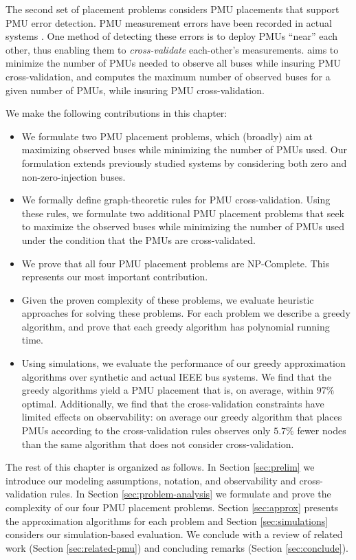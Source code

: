 The second set of placement problems considers PMU placements that support PMU error detection. PMU measurement errors have been recorded in actual systems \cite{Vanfretti10}. 
One method of detecting these errors is to deploy PMUs ``near'' each other, thus enabling them to {\em cross-validate} each-other's measurements. 
{\xvals} aims to minimize the number of PMUs needed to observe all buses while insuring PMU cross-validation, and {\xvalparts} computes the maximum number of observed buses for a given number of PMUs, while insuring PMU cross-validation.


We make the following contributions in this chapter: 
\begin{itemize}
    
	\item We formulate two PMU placement problems, which (broadly) aim at maximizing observed buses while minimizing the number of PMUs used. Our formulation extends previously studied systems by 
	considering both zero and non-zero-injection buses.

    \item We formally define graph-theoretic rules for PMU cross-validation. Using these rules, we formulate two additional PMU placement problems that seek to maximize the observed buses while minimizing
	the number of PMUs used under the condition that the PMUs are cross-validated. 

    \item We prove that all four PMU placement problems are NP-Complete. This represents our most important contribution.

	\item Given the proven complexity of these problems, we evaluate heuristic approaches for solving these problems. For each problem we describe a greedy algorithm, and prove that each greedy
	algorithm has polynomial running time.

	\item Using simulations, we evaluate the performance of our greedy approximation algorithms over synthetic and actual
	IEEE bus systems. We find that the greedy algorithms yield a PMU placement that is, on average, within $97\%$ optimal. Additionally, we find that 
	the cross-validation constraints have limited effects on observability: on average our greedy algorithm that places PMUs according to the cross-validation rules observes 
	only $5.7\%$ fewer nodes than the same algorithm that does not consider cross-validation.

\end{itemize}

The rest of this chapter is organized as follows. In Section \ref{sec:prelim} we introduce our modeling assumptions, notation, and observability and cross-validation rules. In Section \ref{sec:problem-analysis} we formulate and prove the complexity of our four PMU placement problems. Section \ref{sec:approx} presents the approximation algorithms for each problem and Section \ref{sec:simulations} considers our simulation-based evaluation. We conclude with a review of related work (Section \ref{sec:related-pmu}) 
and concluding remarks (Section \ref{sec:conclude}).
